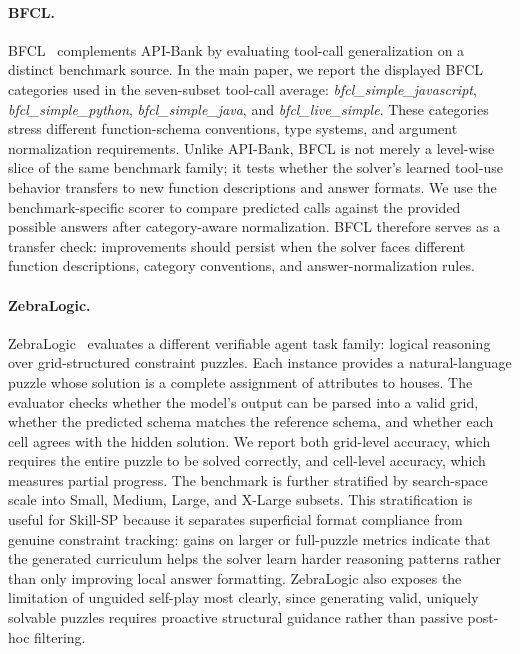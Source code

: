 \paragraph{BFCL.}
BFCL~\citep{patil2025berkeley} complements API-Bank by evaluating tool-call generalization on a distinct benchmark source.
In the main paper, we report the displayed BFCL categories used in the seven-subset tool-call average: \textit{bfcl\_simple\_javascript}, \textit{bfcl\_simple\_python}, \textit{bfcl\_simple\_java}, and \textit{bfcl\_live\_simple}.
These categories stress different function-schema conventions, type systems, and argument normalization requirements.
Unlike API-Bank, BFCL is not merely a level-wise slice of the same benchmark family; it tests whether the solver's learned tool-use behavior transfers to new function descriptions and answer formats.
We use the benchmark-specific scorer to compare predicted calls against the provided possible answers after category-aware normalization.
BFCL therefore serves as a transfer check: improvements should persist when the solver faces different function descriptions, category conventions, and answer-normalization rules.

\paragraph{ZebraLogic.}
ZebraLogic~\citep{lin2025zebralogic} evaluates a different verifiable agent task family: logical reasoning over grid-structured constraint puzzles.
Each instance provides a natural-language puzzle whose solution is a complete assignment of attributes to houses.
The evaluator checks whether the model's output can be parsed into a valid grid, whether the predicted schema matches the reference schema, and whether each cell agrees with the hidden solution.
We report both grid-level accuracy, which requires the entire puzzle to be solved correctly, and cell-level accuracy, which measures partial progress.
The benchmark is further stratified by search-space scale into Small, Medium, Large, and X-Large subsets.
This stratification is useful for Skill-SP because it separates superficial format compliance from genuine constraint tracking: gains on larger or full-puzzle metrics indicate that the generated curriculum helps the solver learn harder reasoning patterns rather than only improving local answer formatting.
ZebraLogic also exposes the limitation of unguided self-play most clearly, since generating valid, uniquely solvable puzzles requires proactive structural guidance rather than passive post-hoc filtering.




